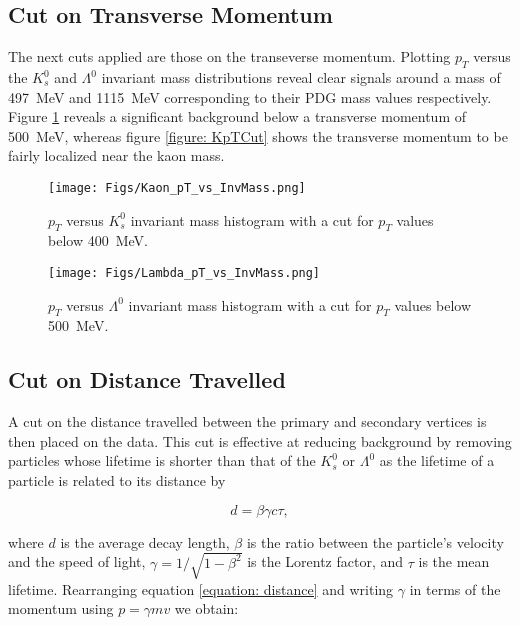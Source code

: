 \documentclass{article}
\begin{document}
\subsection{Cut on Transverse Momentum}
The next cuts applied are those on the transeverse momentum. Plotting $p_T$
versus the $K_s^0$ and $\Lambda^0$ invariant mass distributions reveal clear
signals around a mass of \SI{497}{MeV} and \SI{1115}{MeV} corresponding to their
PDG mass values respectively. Figure \ref{figure: LpTCut} reveals a significant
background below a transverse momentum of \SI{500}{MeV}, whereas figure
\ref{figure: KpTCut} shows the transverse momentum to be fairly localized near
the kaon mass.
\begin{figure}[!h]
\centering
\begin{minipage}{.48\textwidth}
\centering
\texttt{[image: Figs/Kaon\_pT\_vs\_InvMass.png]}
\caption{\small $p_T$ versus $K_s^0$ invariant mass histogram with a cut for $p_T$ values below \SI{400}{MeV}.}
\label{figure: KpTCut}
\end{minipage}%
\hfill
\begin{minipage}{.48\textwidth}
\centering
\texttt{[image: Figs/Lambda\_pT\_vs\_InvMass.png]}
\caption{\small $p_T$ versus $\Lambda^0$ invariant mass histogram with a cut for $p_T$ values below \SI{500}{MeV}.}
\label{figure: LpTCut}
\end{minipage}
\end{figure}

\subsection{Cut on Distance Travelled}
A cut on the distance travelled between the primary and secondary vertices is
then placed on the data. This cut is effective at reducing background by
removing particles whose lifetime is shorter than that of the $K_s^0$ or
$\Lambda^0$ as the lifetime of a particle is related to its distance by 

\begin{equation}
    \label{equation: distance}
    d = \beta\gamma c\tau,
\end{equation}

where $d$ is the average decay length, $\beta$ is the ratio between the particle's velocity and the speed of light, 
$\gamma = 1/\sqrt{1-\beta^2}$ is the Lorentz factor, and $\tau$ is the mean lifetime. Rearranging equation \ref{equation: distance}
and writing $\gamma$ in terms of the momentum using $p = \gamma mv$ we obtain:
\end{document}
